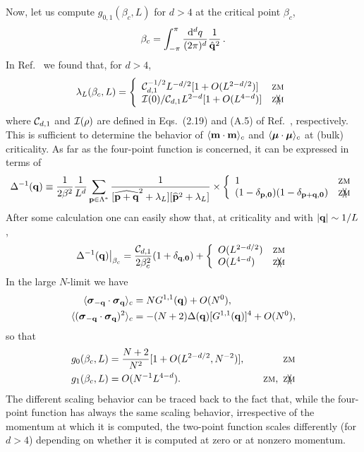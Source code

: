 \documentclass[12pt]{article}
\newcommand{\pos}[1]{\mathbf{#1}}
\begin{document}
Now, let us compute $g_{0,1}(\beta_c,L)$ for $d>4$ at the critical point 
$\beta_c$, 
\begin{equation}
\beta_c =
\int_{-\pi}^{\pi}\frac{{\rm d}^dq}{(2\pi)^d}\frac{1}{\hat{{\bf q}}^2} \, .
\end{equation}
In Ref.~\cite{correlation_length} we found that, for $d>4$,
\begin{equation}
\lambda_L(\beta_c,L) =  
\left\{
\begin{array}{lc}
{\cal C}_{d,1}^{-1/2} L^{-d/2}[1 + O(L^{2-d/2})] & \zm \\
{\cal I}(0)/{\cal C}_{d,1} L^{2-d}[1+O(L^{4-d})] & \nzm
\end{array}
\right.
\end{equation}
where ${\cal C}_{d,1}$ and ${\cal I}(\rho)$ are defined in Eqs.~(2.19) and
(A.5) of Ref.~\cite{correlation_length}, respectively. This is
sufficient to determine the behavior of $\langle
{\bf m}\cdot{\bf m}\rangle_c$ 
and $\langle\mbox{\protect\boldmath $\mu$}\cdot\mbox{\protect\boldmath $\mu$}\rangle_c$ at (bulk) criticality. As far as
the four-point function is concerned, it can be expressed in terms of
\begin{equation}
\Delta^{-1}(\ve{q}) \equiv \frac{1}{2\beta^2} 
{1\over L^d} \sum_{\pos{p}\in \Lambda^*}
\frac{1}{[\widehat{\ve{p} + \ve{q}}^2 +
\lambda_L][\widehat{\ve{p}}^2 +
\lambda_L]}  \times 
\left\{
\begin{array}{lc}
1 & \mbox{\zm} \\
(1-\delta_{\ve{p},\ve{0}})(1-\delta_{\ve{p}+\ve{q},\ve{0}}) & \mbox{\nzm} 
\end{array}
\right.
\end{equation}
After some calculation one can easily show that, at criticality and
with $|{\bf q}|\sim 1/L$,
\begin{equation}
\left. \Delta^{-1}(\ve{q})\right|_{\beta_c} = \frac{{\cal C}_{d,1}}{2\beta_c^2}
(1+\delta_{\ve{q},\ve{0}}) + 
\left\{
\begin{array}{lc}
O(L^{2-d/2})& \mbox{\zm} \\
O(L^{4-d}) & \mbox{\nzm} 
\end{array}
\right.
\end{equation}
In the large $N$-limit we have
\begin{align}
\langle \mbox{\protect\boldmath $\sigma$}_{-{\bf q}}\cdot\mbox{\protect\boldmath $\sigma$}_{{\bf q}}\rangle_c &=
N G^{1,1}({\bf q}) + O(N^0), \\
\langle (\mbox{\protect\boldmath $\sigma$}_{-{\bf q}}\cdot\mbox{\protect\boldmath $\sigma$}_{{\bf q}})^2\rangle_c &= - 
(N + 2) \Delta({\bf q}) [G^{1,1}({\bf q})]^4 + O(N^0), 
\end{align}
so that 
\begin{align}
g_0(\beta_c,L) &= \frac{N+2}{N^2} [1+O(L^{2-d/2},N^{-2})] ,&\quad \zm\\
g_1(\beta_c,L) &= O(N^{-1}L^{4-d}) . &\quad \zm,\ \nzm
\end{align}
The different scaling behavior can be traced back to the fact that,
while the four-point function has always the same scaling behavior,
irrespective of the momentum at which it is computed, the two-point
function scales differently (for $d>4$) depending on whether it is
computed at zero or at nonzero momentum.
\end{document}
